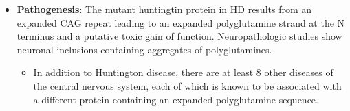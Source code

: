 \documentclass[plain,basic]{inVerba-notes}
\begin{document}
\begin{itemize}
    \item \textbf{Pathogenesis}: The mutant huntingtin protein in HD results from an expanded CAG repeat leading to an expanded polyglutamine strand at the N terminus and a putative toxic gain of function. Neuropathologic studies show neuronal inclusions containing aggregates of polyglutamines.~\cite{walker2007huntington}
        \begin{itemize}
            \item In addition to Huntington disease, there are at least 8 other diseases of the central nervous system, each of which is known to be associated with a different protein containing an expanded polyglutamine sequence. 
        \end{itemize}
\end{itemize}

\nocite{*}


\end{document}
